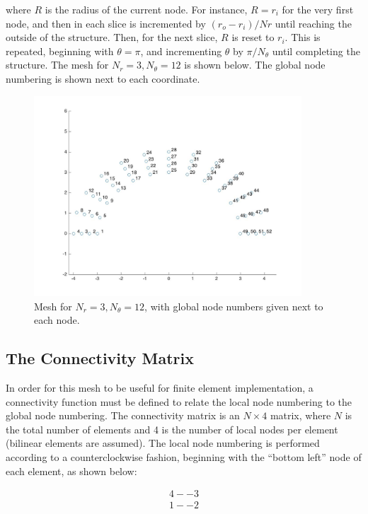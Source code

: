 \documentclass[10pt]{article}
\begin{document}
where \(R\) is the radius of the current node. For instance, \(R=r_i\) for the very first node, and then in each slice is incremented by \((r_o-r_i)/Nr\) until reaching the outside of the structure. Then, for the next slice, \(R\) is reset to \(r_i\). This is repeated, beginning with \(\theta=\pi\), and incrementing \(\theta\) by \(\pi/N_\theta\) until completing the structure. The mesh for \(N_r=3,N_\theta=12\) is shown below. The global node numbering is shown next to each coordinate.

\begin{figure}[H]
  \centering
  \includegraphics[width=10cm]{Mesh.jpg}
  \caption{Mesh for \(N_r=3, N_\theta=12\), with global node numbers given next to each node.}
  \label{fig:Mesh}
\end{figure}

\subsection{The Connectivity Matrix}

In order for this mesh to be useful for finite element implementation, a connectivity function must be defined to relate the local node numbering to the global node numbering. The connectivity matrix is an \(N\times4\) matrix, where \(N\) is the total number of elements and 4 is the number of local nodes per element (bilinear elements are assumed). The local node numbering is performed according to a counterclockwise fashion, beginning with the ``bottom left'' node of each element, as shown below:

\begin{equation}
\begin{aligned}
4 -- 3 \\
1 -- 2 \\
\end{aligned}
\end{equation}
\end{document}
